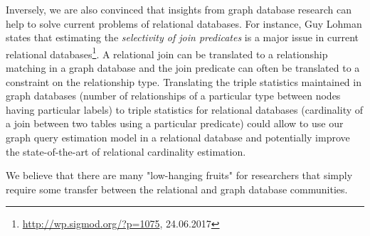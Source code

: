 Inversely, we are also convinced that insights from graph database research can
help to solve current problems of relational databases.
For instance, Guy Lohman states that estimating the
\emph{selectivity of join predicates} is a major issue in  current relational
databases\footnote{\url{http://wp.sigmod.org/?p=1075}, 24.06.2017}.
A relational join can be translated to a relationship matching in a graph database and the
join predicate can often be translated to a constraint on the relationship
type.
Translating the triple statistics maintained in graph databases (number of
relationships of a particular type between nodes having particular labels) to
triple statistics for relational databases (cardinality of a join between two
tables using a particular predicate) could allow to use our graph query
estimation model in a relational database and potentially improve the
state-of-the-art of relational cardinality estimation.

We believe that there are many "low-hanging fruits" for researchers that simply
require some transfer between the relational and graph database communities.
